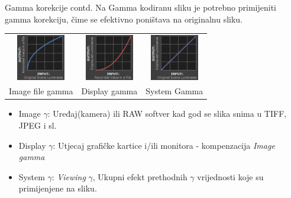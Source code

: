 \documentclass[9pt]{beamer}
\begin{document}
\begin{frame}{Gamma korekcije contd.}
	Na Gamma kodiranu sliku je potrebno primijeniti gamma korekciju, čime se efektivno poništava na originalnu sliku.
	\begin{center}
		\begin{tabular}{ccc}
			\includegraphics[height=2cm]{slike/05_gamma_chart3c.png} & 
			\includegraphics[height=2cm]{slike/05_gamma_chart4d.png}&
			\includegraphics[height=2cm]{slike/05_gamma_chart5c.png} \\
			Image file gamma & Display gamma & System Gamma
		\end{tabular}
	\end{center}
	\begin{itemize}
		\item Image $\gamma$: Uređaj(kamera) ili RAW softver kad god se slika snima u TIFF, JPEG i sl.
		\item Display $\gamma$: Utjecaj grafičke kartice i/ili monitora - kompenzacija \textit{Image gamma}
		\item System $\gamma$: \textit{Viewing} $\gamma$, Ukupni efekt prethodnih $\gamma$ vrijednosti koje su primijenjene na sliku.
	\end{itemize}
\end{frame}

\end{document}

